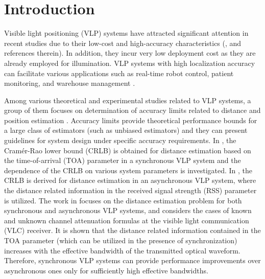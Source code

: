 \documentclass[10pt,twocolumn]{IEEEtran}
\begin{document}


%
\IEEEpeerreviewmaketitle

\section{Introduction}\label{sec:Intro}


Visible light positioning (VLP) systems have attracted significant attention in recent studies due to their low-cost and high-accuracy characteristics (\cite{SurveyVLPprocIEEE,MFK_ProcIEEE}, and references therein). In addition, they incur very low deployment cost as they are already employed for illumination. VLP systems with high localization accuracy can facilitate various applications such as real-time robot control, patient monitoring, and warehouse management \cite{VLP_Roadmap,SurveyVLProto,VLPind40}.

Among various theoretical and experimental studies related to VLP systems, a group of them focuses on determination of accuracy limits related to distance and position estimation \cite{CRB_TOA_VLC,VLP_CRLB_RSS,MFK_CRLB,IG_RSS_AOA_VLC,Erdal_CL_2015,ZZB_MFK,Direct_TCOM}. Accuracy limits provide theoretical performance bounds for a large class of estimators (such as unbiased estimators) and they can present guidelines for system design under specific accuracy requirements. In \cite{CRB_TOA_VLC}, the Cram\'{e}r-Rao lower bound (CRLB) is obtained for distance estimation based on the time-of-arrival (TOA) parameter in a synchronous VLP system and the dependence of the CRLB on various system parameters is investigated. In \cite{VLP_CRLB_RSS}, the CRLB is derived for distance estimation in an asynchronous VLP system, where the distance related information in the received signal strength (RSS) parameter is utilized. The work in \cite{MFK_CRLB} focuses on the distance estimation problem for both synchronous and asynchronous VLP systems, and considers the cases of known and unknown channel attenuation formulas at the visible light communication (VLC) receiver. It is shown that the distance related information contained in the TOA parameter (which can be utilized in the presence of synchronization) increases with the effective bandwidth of the transmitted optical waveform. Therefore, synchronous VLP systems can provide performance improvements over asynchronous ones only for sufficiently high effective bandwidths.
\end{document}
